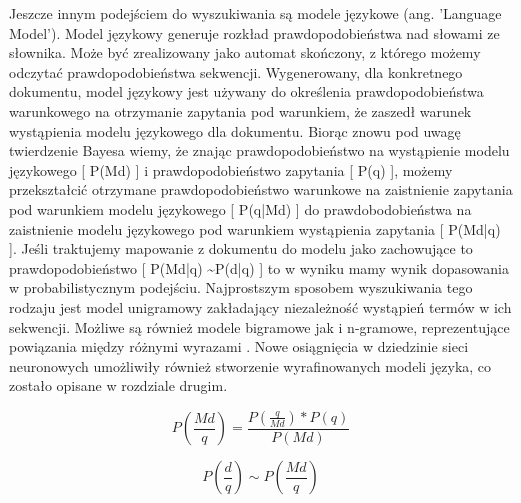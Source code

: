 Jeszcze innym podejściem do wyszukiwania są modele językowe (ang. 'Language Model').
Model językowy generuje rozkład prawdopodobieństwa nad słowami ze słownika. Może być
zrealizowany jako automat skończony, z którego możemy odczytać prawdopodobieństwa sekwencji.
Wygenerowany, dla konkretnego dokumentu, model językowy jest używany do określenia
prawdopodobieństwa warunkowego na otrzymanie zapytania pod warunkiem, że zaszedł warunek
wystąpienia modelu językowego dla dokumentu. Biorąc znowu pod uwagę twierdzenie Bayesa wiemy,
że znając prawdopodobieństwo na wystąpienie modelu językowego [ P(Md) ] i prawdopodobieństwo zapytania [ P(q) ], możemy przekształcić otrzymane prawdopodobieństwo warunkowe na zaistnienie zapytania pod warunkiem modelu językowego [ P(q|Md) ] do prawdobodobieństwa na zaistnienie modelu językowego pod warunkiem wystąpienia zapytania [ P(Md|q) ]. Jeśli traktujemy mapowanie z dokumentu do modelu jako zachowujące to
prawdopodobieństwo [ P(Md|q) \textasciitilde P(d|q) ] to w wyniku mamy wynik dopasowania w probabilistycznym
podejściu. Najprostszym sposobem wyszukiwania tego rodzaju jest model unigramowy zakładający niezależność
wystąpień termów w ich sekwencji. Możliwe są również modele bigramowe jak i n-gramowe,
reprezentujące powiązania między różnymi wyrazami \autocite{introtoinformationretrieval}. Nowe osiągnięcia w dziedzinie sieci
neuronowych umożliwiły również stworzenie wyrafinowanych modeli języka, co zostało opisane w rozdziale drugim.


\begin{equation}
P(\frac{Md}{q})=\frac{P(\frac{q}{Md})*P(q)}{P(Md)}
\end{equation}

\begin{equation}
P(\frac{d}{q}) \sim P(\frac{Md}{q})
\end{equation}\newline

